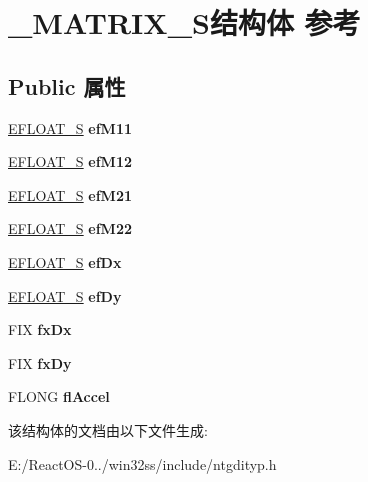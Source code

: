 \hypertarget{struct___m_a_t_r_i_x___s}{}\section{\+\_\+\+M\+A\+T\+R\+I\+X\+\_\+\+S结构体 参考}
\label{struct___m_a_t_r_i_x___s}
\subsection*{Public 属性}
\begin{DoxyCompactItemize}
\item 
\mbox{\label{struct___m_a_t_r_i_x___s_a55a62e41c9fba40c3092b69072e64681}} 
\hyperlink{struct___e_f_l_o_a_t___s}{E\+F\+L\+O\+A\+T\+\_\+S} {\bfseries ef\+M11}
\item 
\mbox{\label{struct___m_a_t_r_i_x___s_a2b91986d74c1fdd5c826ecebcb50ee4c}} 
\hyperlink{struct___e_f_l_o_a_t___s}{E\+F\+L\+O\+A\+T\+\_\+S} {\bfseries ef\+M12}
\item 
\mbox{\label{struct___m_a_t_r_i_x___s_a28656f05c018da7cab7e0f5d61de34ed}} 
\hyperlink{struct___e_f_l_o_a_t___s}{E\+F\+L\+O\+A\+T\+\_\+S} {\bfseries ef\+M21}
\item 
\mbox{\label{struct___m_a_t_r_i_x___s_a697f24cc20d77199c3e9e78b1d8691ec}} 
\hyperlink{struct___e_f_l_o_a_t___s}{E\+F\+L\+O\+A\+T\+\_\+S} {\bfseries ef\+M22}
\item 
\mbox{\label{struct___m_a_t_r_i_x___s_ac648bbea463d4fab13349f6527a8a84e}} 
\hyperlink{struct___e_f_l_o_a_t___s}{E\+F\+L\+O\+A\+T\+\_\+S} {\bfseries ef\+Dx}
\item 
\mbox{\label{struct___m_a_t_r_i_x___s_a0a3fe54956d3f26f0d1d7ec14628192b}} 
\hyperlink{struct___e_f_l_o_a_t___s}{E\+F\+L\+O\+A\+T\+\_\+S} {\bfseries ef\+Dy}
\item 
\mbox{\label{struct___m_a_t_r_i_x___s_aef1b6bdc09956a0dcba53d543ad9baf0}} 
F\+IX {\bfseries fx\+Dx}
\item 
\mbox{\label{struct___m_a_t_r_i_x___s_a8373c9f9148b9b11d47994081876203a}} 
F\+IX {\bfseries fx\+Dy}
\item 
\mbox{\label{struct___m_a_t_r_i_x___s_a7fd51d59d271a93bb156cbad23f81b65}} 
F\+L\+O\+NG {\bfseries fl\+Accel}
\end{DoxyCompactItemize}


该结构体的文档由以下文件生成\+:\begin{DoxyCompactItemize}
\item 
E\+:/\+React\+O\+S-\/0../win32ss/include/ntgdityp.\+h\end{DoxyCompactItemize}
